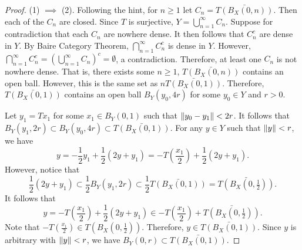 \documentclass[a4paper]{article}
\begin{document}
\begin{proof}
  (1) $\implies$ (2). Following the hint, for $n \geq 1$ let
  $C_n = \bar{T(B_X(0, n))}$. Then each of the $C_n$ are closed.
  Since $T$ is surjective, $Y = \bigcup_{n=1}^\infty C_n$.
  Suppose for contradiction that each $C_n$ are nowhere dense.
  It then follows that $C_n^c$ are dense in $Y$. By Baire Category
  Theorem, $\bigcap_{n=1}^\infty C_n^c$ is dense in $Y$. However,
  $\bigcap_{n=1}^\infty C_n^c = \left( \bigcup_{n=1}^\infty C_n \right)^c
    = \emptyset$, a contradiction. Therefore, at least one $C_n$
  is not nowhere dense. That is, there exists some $n \geq 1$,
  $\bar{T(B_X(0, n))}$ contains an open ball. However,
  this is the same set as $n \bar{T(B_X(0, 1))}$. Therefore,
  $\bar{T(B_X(0, 1))}$ contains an open ball $B_Y(y_0, 4 r)$
  for some $y_0 \in Y$ and $r > 0$.

  Let $y_1 = T x_1$ for some $x_1 \in B_Y(0,1)$ such that $\left\lVert y_0 -
  y_1\right\rVert < 2 r$. It follows that $B_Y(y_1, 2 r) \subset B_Y(y_0, 4 r)
  \subset \bar{T(B_X(0,1))}$. For any $y \in Y$ such that $\left\lVert y\right\rVert < r$,
  we have
  \[
    y = -\frac{1}{2} y_1 + \frac{1}{2} (2 y + y_1) =
    - T \left( \frac{x_1}{2} \right) + \frac{1}{2} (2 y + y_1).
  \]
  However, notice that
  \[
    \frac{1}{2} (2 y + y_1) \subset \frac{1}{2} B_Y(y_1, 2r)
    \subset \frac{1}{2} \bar{T(B_X(0, 1))}
    = \bar{T(B_X(0, \tfrac{1}{2}))} .
  \]
  It follows that
  \[
    y = - T \left( \frac{x_1}{2} \right) + \frac{1}{2} (2 y + y_1)
    \in - T \left( \frac{x_1}{2} \right) + \bar{T(B_X(0, \tfrac{1}{2}))}.
  \]
  Note that $- T(\frac{x_1}{2}) \in T(B_X(0, \frac{1}{2}))$. Therefore, $y
  \in \bar{T(B_X(0, 1))}$. Since $y$ is arbitrary with $\left\lVert y\right\rVert < r$, we
  have $B_Y(0, r) \subset \bar{T(B_X(0,1))}$.


\end{proof}
\end{document}
